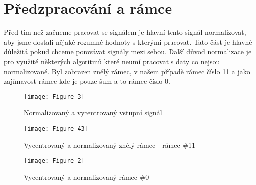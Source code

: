 \section{Předzpracování a rámce}

Před tím než začneme pracovat se signálem je hlavní tento signál normalizovat, aby jsme dostali nějaké rozumné hodnoty s kterými pracovat.
Tato část je hlavně důležitá pokud chceme porovávat signály mezi sebou. Další důvod normalizace je pro využité některých algoritmů které neumí pracovat s daty co nejsou normalizované.
Byl zobrazen znělý rámec, v našem případě rámec číslo 11 a jako zajímavost rámec kde je pouze šum a to rámec číslo 0.

\begin{figure}[H] 
	\centering
	\texttt{[image: Figure\_3]}
	\caption{Normalizovaný a vycentrovaný vstupní signál}
\end{figure}

\begin{figure}[H] 
	\centering
	\texttt{[image: Figure\_43]}
	\caption{Vycentrovaný a normalizovaný znělý rámec - rámec \#11}
\end{figure}

\begin{figure}[H] 
	\centering
	\texttt{[image: Figure\_2]}
	\caption{Vycentrovaný a normalizovaný rámec \#0}
\end{figure}